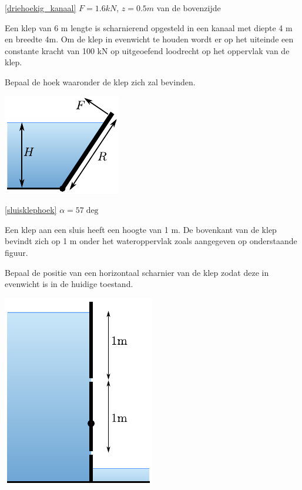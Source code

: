 \begin{antwoord}{\ref{driehoekig_kanaal}}
	$F = 1.6 \unit{kN}$, $z=0.5 \unit{m}$ van de bovenzijde
\end{antwoord}
\begin{toepassing}
	\label{sluisklephoek}
Een klep van 6 m lengte is scharnierend opgesteld in een kanaal met diepte 4 m en breedte 4m. Om de klep in evenwicht te houden wordt er op het uiteinde een constante kracht van 100 kN op uitgeoefend loodrecht op het oppervlak van de klep.
		
Bepaal de hoek waaronder de klep zich zal bevinden.

	\centering
	\includegraphics{fig/hydrostatica/sluisklephoek}
\end{toepassing}
\begin{antwoord}{\ref{sluisklephoek}}
	$\alpha = 57\deg$
\end{antwoord}	
\begin{toepassing}[*]
	\label{sluisklep}
Een klep aan een sluis heeft een hoogte van 1 m. De bovenkant van de klep bevindt zich op 1 m onder het wateroppervlak zoals aangegeven op onderstaande figuur.
		
Bepaal de positie van een horizontaal scharnier van de klep zodat deze in evenwicht is in de huidige toestand.

	\centering
	\includegraphics{fig/hydrostatica/sluisklep}
\end{toepassing}
